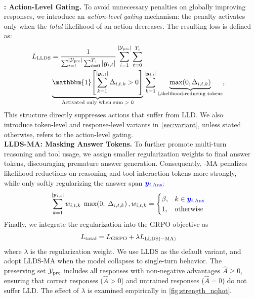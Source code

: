 \\
\textbf{\ours{}: Action-Level Gating.} To avoid unnecessary penalties on globally improving responses, we introduce an \emph{action-level gating} mechanism: the penalty activates only when the \emph{total} likelihood of an action decreases. The resulting \ours{} loss is defined as:
\begin{align}
L_{\mathrm{LLDS}}
&=
\frac{1}{\sum_{i=1}^{|\mathcal{Y}_{\mathrm{pre}}|}\sum_{t=0}^{T_i} |\y_{i,t}|}
\sum_{i=1}^{|\mathcal{Y}_{\mathrm{pre}}|}
\sum_{t=0}^{T_i}
\nn \\ & \underbrace{\mathbbm{1}\!\left[
\sum_{k=1}^{|\y_{i,t}|}
\Delta_{i,t,k}
> 0
\right]}_{\text{Activated only when sum > 0}}
\sum_{k=1}^{|\y_{i,t}|}
\underbrace{\max(0,\Delta_{i,t,k})}_{\text{Likelihood-reducing tokens}},
\label{eq:llds}
\end{align}
This structure directly suppresses actions that suffer from LLD. We also introduce token-level and response-level variants in~\cref{sec:variant}, unless stated otherwise, \ours{} refers to the action-level gating. 
\\
\textbf{LLDS-MA: Masking Answer Tokens.} To further promote multi-turn reasoning and tool usage, we assign smaller regularization weights to final answer tokens, discouraging premature answer generation. Consequently, \ours{}-MA penalizes likelihood reductions on reasoning and tool-interaction tokens more strongly, while only softly regularizing the answer span $\textcolor{blue}{\bm{y}_{i,\rm Ans}}$:
\begin{align}
\sum_{k=1}^{|\mathbf{y}_{i,t}|}
w_{i,t,k}\;
\max\!\left(
0,\;
\Delta_{i,t,k}
\right), w_{i,t,k}
=
\begin{cases}
\beta, & k \in \textcolor{blue}{\bm{y}_{i,\rm Ans}} \\
1, & \text{otherwise}
\end{cases}
\end{align}
Finally, we integrate the regularization into the GRPO objective as
\begin{align}
    L_{\rm total} = L_{\rm GRPO} + \lambda L_{\rm{LLDS(-MA)}}
\end{align}
where $\lambda$ is the regularization weight. We use LLDS as the default variant, and adopt LLDS-MA when the model collapses to single-turn behavior.  The preserving set $\mathcal{Y}_{\rm pre}$ includes all responses with non-negative advantages $\hat{A} \ge 0$, ensuring that correct responses ($\hat{A} > 0$) and untrained responses ($\hat{A} = 0$) do not suffer LLD. The effect of $\lambda$ is examined empirically in \cref{fig:strength_nqhot}.
